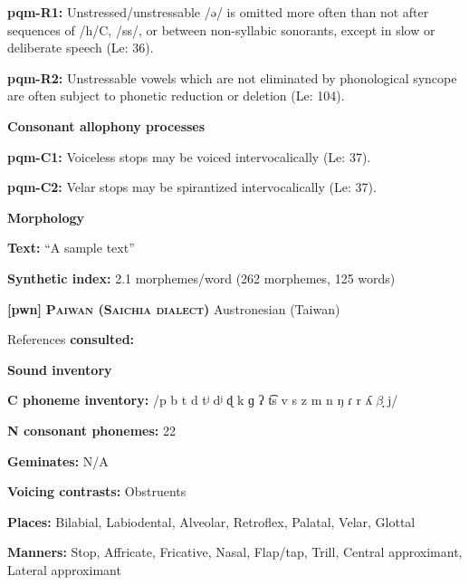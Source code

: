 \textbf{pqm-R1:} Unstressed/unstressable /ə/ is omitted more often than not after sequences of /h/C, /ss/, or between non-syllabic sonorants, except in slow or deliberate speech (Le\citealt{Sourd1996}: 36).



\textbf{pqm-R2:} Unstressable vowels which are not eliminated by phonological syncope are often subject to phonetic reduction or deletion (Le\citealt{Sourd1996}: 104).



\textbf{Consonant allophony processes}



\textbf{pqm-C1:} Voiceless stops may be voiced intervocalically (Le\citealt{Sourd1993}: 37).



\textbf{pqm-C2:} Velar stops may be spirantized intervocalically (Le\citealt{Sourd1993}: 37).



\textbf{Morphology}



\textbf{Text:} “A sample text” \citep[55-58]{Leavitt1996}



\textbf{Synthetic index:} 2.1 morphemes/word (262 morphemes, 125 words)



\textbf{[pwn]}   \textbf{\textsc{Paiwan (Saichia dialect)}}  Austronesian (Taiwan)



References \textbf{consulted:} \citet{Chang2006}



\textbf{Sound inventory}



\textbf{C phoneme inventory:} /p b t d tʲ dʲ ɖ k ɡ ʔ t͡s v s z m n ŋ ɾ r ʎ $\beta ̞$ j/



\textbf{N consonant phonemes:} 22



\textbf{Geminates:} N/A



\textbf{Voicing contrasts:} Obstruents



\textbf{Places:} Bilabial, Labiodental, Alveolar, Retroflex, Palatal, Velar, Glottal



\textbf{Manners:} Stop, Affricate, Fricative, Nasal, Flap/tap, Trill, Central approximant, Lateral approximant



